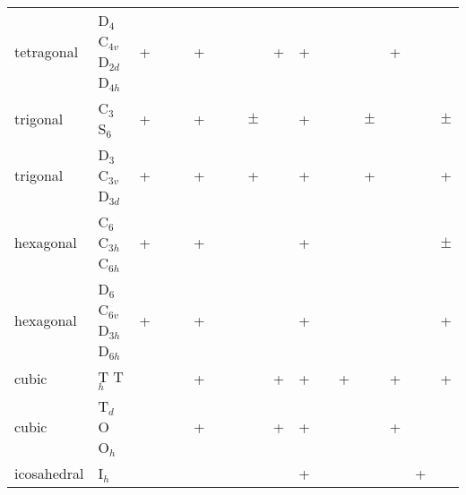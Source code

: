 \begin{landscape}
\begin{table}
\begin{tabular}{lllllllllllllllll}
tetragonal & D$_{4}$ C$_{4v}$ D$_{2d}$ D$_{4h}$ &+      &       & &+      &       &       &       &+      &+      &       &       & &+      &       &       \\
trigonal   & C$_{3}$ S$_{6}$                    &+      &       & &+      &       &       &$\pm$  &       &+      &       &       &$\pm$&      &       &$\pm$  \\
trigonal   & D$_{3}$ C$_{3v}$ D$_{3d}$          &+      &       & &+      &       &       &+      &       &+      &       &       &+ &       &       &+      \\
hexagonal  & C$_{6}$ C$_{3h}$ C$_{6h}$          &+      &       & &+      &       &       &       &       &+      &       &       & &       &       &$\pm$  \\
hexagonal  & D$_{6}$ C$_{6v}$ D$_{3h}$ D$_{6h}$ &+      &       & &+      &       &       &       &       &+      &       &       & &       &       &+      \\
cubic      & T         T$_{h}$                  &       &       & &+      &       &       &       &+      &+      &       &+      & &+      &       &+      \\
cubic      &   T$_{d}$  O O$_{h}$               &       &       & &+      &       &       &       &+      &+      &       &       & &+      &       &       \\
icosahedral & I$_h$                             &       &       & &       &       &       &       &       &+      &       &       & &       &+      &       \\
\end{tabular}
\end{table}


\end{landscape}